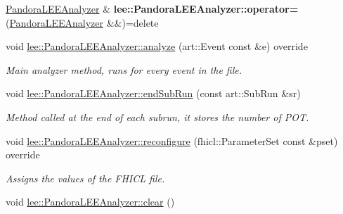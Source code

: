 \begin{DoxyCompactItemize}
\item 
\hypertarget{group__lee_ga79984f454c76dbb927254731d85e40c4}{\hyperlink{classPandoraLEEAnalyzer}{Pandora\-L\-E\-E\-Analyzer} \& {\bfseries lee\-::\-Pandora\-L\-E\-E\-Analyzer\-::operator=} (\hyperlink{classPandoraLEEAnalyzer}{Pandora\-L\-E\-E\-Analyzer} \&\&)=delete}\label{group__lee_ga79984f454c76dbb927254731d85e40c4}

\item 
void \hyperlink{group__lee_gab6142fdaa2037d01df2304cbb17d59b0}{lee\-::\-Pandora\-L\-E\-E\-Analyzer\-::analyze} (art\-::\-Event const \&e) override
\begin{DoxyCompactList}\small\item\em Main analyzer method, runs for every event in the file. \end{DoxyCompactList}\item 
void \hyperlink{group__lee_gaede981b7ff7b78309f2457c40581ba71}{lee\-::\-Pandora\-L\-E\-E\-Analyzer\-::end\-Sub\-Run} (const art\-::\-Sub\-Run \&sr)
\begin{DoxyCompactList}\small\item\em Method called at the end of each subrun, it stores the number of P\-O\-T. \end{DoxyCompactList}\item 
void \hyperlink{group__lee_ga4696139a07194b86735e93fe0d9df45e}{lee\-::\-Pandora\-L\-E\-E\-Analyzer\-::reconfigure} (fhicl\-::\-Parameter\-Set const \&pset) override
\begin{DoxyCompactList}\small\item\em Assigns the values of the F\-H\-I\-C\-L file. \end{DoxyCompactList}\item 
\hypertarget{group__lee_ga9d8072bae8c7e78701c093070d17c992}{void \hyperlink{group__lee_ga9d8072bae8c7e78701c093070d17c992}{lee\-::\-Pandora\-L\-E\-E\-Analyzer\-::clear} ()}\label{group__lee_ga9d8072bae8c7e78701c093070d17c992}


\end{DoxyCompactItemize}
